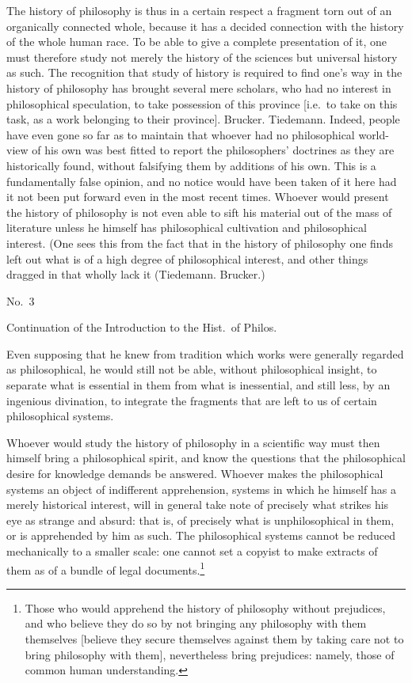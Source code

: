 \documentclass[12pt]{article}
\newcommand{\opage}[1]{\marginnote{\footnotesize\textit{[#1]}}}
\begin{document}
The history of philosophy is thus in a certain respect a fragment torn out of an organically connected whole, because it has a decided connection with the history of the whole human race. To be able to give a complete presentation of it, one must therefore study not merely the history of the sciences but universal history as such. The recognition that study of history is required to find one's way in the history of philosophy has brought several mere scholars, who had no interest in philosophical speculation, to take possession of this province [i.e.\ to take on this task, as a work belonging to their province]. Brucker. Tiedemann. Indeed, people have even gone so far as to maintain that whoever had no philosophical world-view of his own was best fitted to report the philosophers' doctrines as they are historically found, without falsifying them by additions of his own. This is a fundamentally false opinion, and no notice would have been taken of it here had it not been put forward even in the most recent times. Whoever would present the history of philosophy is not even able to sift his material out of the mass of literature unless he himself has philosophical cultivation and philosophical interest. (One sees this from the fact that in the history of philosophy one finds left out what is of a high degree of philosophical interest, and other things dragged in that wholly lack it (Tiedemann. Brucker.)

\begin{flushright}\opage{5r}No.\ 3\end{flushright}

\begin{center}Continuation of the Introduction to the Hist.\ of Philos.\end{center}

\noindent Even supposing that he knew from tradition which works were generally regarded as philosophical, he would still not be able, without philosophical insight, to separate what is essential in them from what is inessential, and still less, by an ingenious divination, to integrate the fragments that are left to us of certain philosophical systems.

Whoever would study the history of philosophy in a scientific way must then himself bring a philosophical spirit, and know the questions that the philosophical desire for knowledge demands be answered. Whoever makes the philosophical systems an object of indifferent apprehension, systems in which he himself has a merely historical interest, will in general take note of precisely what strikes his eye as strange and absurd: that is, of precisely what is unphilosophical in them, or is apprehended by him as such. The philosophical systems cannot be reduced mechanically to a smaller scale: one cannot set a copyist to make extracts of them as of a bundle of legal documents.\footnote{Those who would apprehend the history of philosophy without prejudices, and who believe they do so by not bringing any philosophy with them themselves [believe they secure themselves against them by taking care not to bring philosophy with them], nevertheless bring prejudices: namely, those of common human understanding.}
\end{document}
